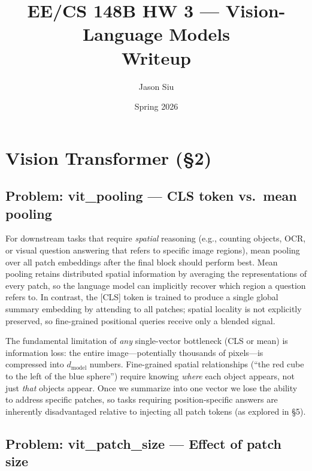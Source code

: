 \documentclass[11pt]{article}
\title{EE/CS 148B HW 3 --- Vision-Language Models\\[0.5em]\large Writeup}
\author{Jason Siu}
\date{Spring 2026}
\begin{document}
\maketitle

\section{Vision Transformer (\S{}2)}

\subsection*{Problem: vit\_pooling --- CLS token vs.\ mean pooling}

For downstream tasks that require \emph{spatial} reasoning (e.g., counting
objects, OCR, or visual question answering that refers to specific image
regions), mean pooling over all patch embeddings after the final block should
perform best. Mean pooling retains distributed spatial information by averaging
the representations of every patch, so the language model can implicitly
recover which region a question refers to. In contrast, the [CLS] token is
trained to produce a single global summary embedding by attending to all
patches; spatial locality is not explicitly preserved, so fine-grained
positional queries receive only a blended signal.

The fundamental limitation of \emph{any} single-vector bottleneck (CLS or
mean) is information loss: the entire image---potentially thousands of
pixels---is compressed into $d_{\mathrm{model}}$ numbers. Fine-grained spatial
relationships (``the red cube to the left of the blue sphere'') require knowing
\emph{where} each object appears, not just \emph{that} objects appear. Once
we summarize into one vector we lose the ability to address specific patches,
so tasks requiring position-specific answers are inherently disadvantaged
relative to injecting all patch tokens (as explored in \S{}5).

\subsection*{Problem: vit\_patch\_size --- Effect of patch size}
\end{document}
